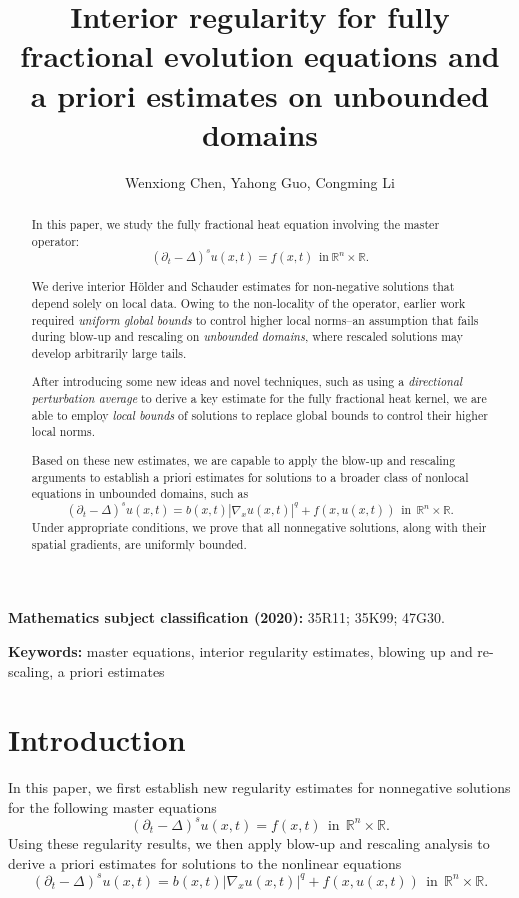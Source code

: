 \documentclass[12pt]{article}
\title{ Interior regularity for fully fractional evolution equations and a priori estimates on unbounded domains}
\author{Wenxiong Chen,
Yahong Guo, Congming Li}
\theoremstyle{remark}
\numberwithin{equation}{section}
\newcommand{\R}{\mathbb{R}}
\begin{document}
\maketitle

\begin{abstract}

In this paper, we study the fully fractional heat equation involving the master operator:
$$
(\partial_t -\Delta)^{s} u(x,t) = f(x,t)\ \ \mbox{in}\ \R^n\times\R.
$$

We derive interior H\"{o}lder and Schauder estimates for non-negative solutions that depend solely on local data. Owing to the non-locality of the operator, earlier work required {\em uniform global bounds} to control higher local norms--an assumption that fails during blow-up and rescaling on {\em unbounded domains}, where rescaled solutions may develop arbitrarily large tails.

After introducing some new ideas and novel techniques, such as using a {\em directional perturbation average} to derive a key estimate for the fully fractional heat kernel, we are able to employ {\em local bounds} of solutions to replace global bounds to control their higher local norms.

Based on these new estimates, we are capable to apply the blow-up and rescaling arguments to establish a priori estimates
for solutions to a broader class of nonlocal equations in unbounded domains, such as
$$(\partial_t -\Delta)^{s} u(x,t) =  b(x,t) |\nabla_x u (x,t)|^q + f(x, u(x,t))\ \ \mbox{in}\ \ \R^n\times\R.$$
Under appropriate conditions, we prove that all nonnegative solutions, along with their spatial gradients, are
uniformly bounded.


 \end{abstract}


 \bigskip


\textbf{Mathematics subject classification (2020): }  35R11; 35K99; 47G30.
\bigskip

\textbf{Keywords:}  master equations, interior regularity estimates, blowing up and re-scaling, a priori estimates     \\
\medskip



\section{Introduction}

In this paper, we first establish new regularity estimates for nonnegative solutions for the following master equations
\begin{equation}\label{1.0}
(\partial_t -\Delta)^{s} u(x,t) =  f(x,t)\ \ \mbox{in}\ \ \R^n\times\R.
\end{equation}
Using these regularity results, we then apply blow-up and rescaling analysis to derive a priori estimates for solutions to the nonlinear equations
\begin{equation}\label{1.1}
(\partial_t -\Delta)^{s} u(x,t) =  b(x,t) |\nabla_x u (x,t)|^q + f(x, u(x,t))\ \ \mbox{in}\ \ \R^n\times\R.
\end{equation}
\end{document}
